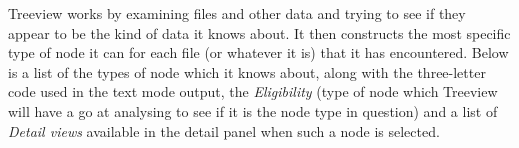 \documentclass[twoside,11pt]{article}
\newcommand{\latexhtml}[2]{#1}
\renewcommand{\_}{\texttt{\symbol{95}}}
\begin{document}
Treeview works by examining files and other data and trying to see
if they appear to be the kind of data it knows about.
It then constructs the most specific type of node it can 
for each file (or whatever it is) that it has encountered.
Below is a list of the types of node which it knows about, 
along with the 
\latexhtml{three-letter code used in the text mode output}
          {icon used in the display},
the {\em Eligibility\/} (type of node which Treeview will have a 
go at analysing to see if it is the node type in question)
and a list of {\em Detail views\/} available in the detail
panel when such a node is selected.
\newcommand{\datanode}[4]{
\item[#1] #2 
\begin{quote}
{\em Eligibility: } #3\\
{\em Detail views: } #4
\end{quote}}
\end{document}
